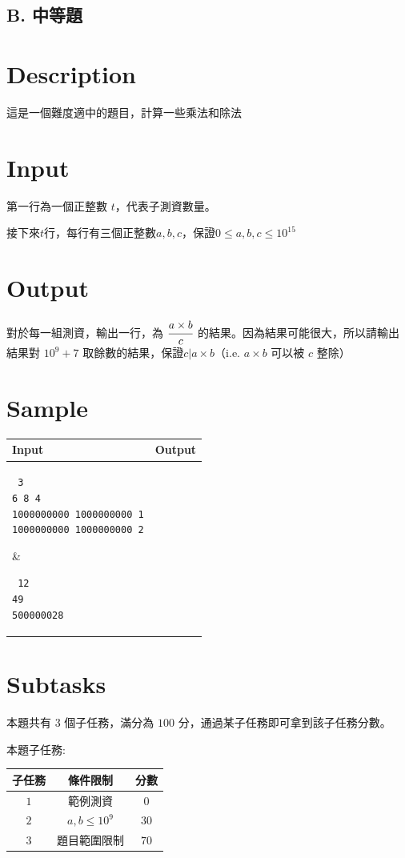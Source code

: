 \documentclass[11pt,a4paper]{article}
\begin{document}
\begin{center}
\section*{B. 中等題}
\end{center}

\section*{Description}

這是一個難度適中的題目，計算一些乘法和除法

\section*{Input}
第一行為一個正整數 $t$，代表子測資數量。

接下來$t$行，每行有三個正整數$a, b, c$，保證$0\leq a, b, c \leq 10^{15}$


\section*{Output}

對於每一組測資，輸出一行，為 $\cfrac{a\times b}{c}$ 的結果。因為結果可能很大，所以請輸出結果對 $10^9 + 7$ 取餘數的結果，保證$c|a\times b$（i.e. $a\times b$ 可以被 $c$ 整除）

\section*{Sample}
\begin{longtable}[!h]{|p{}|p{}|}
\hline
\textbf {Input}	& \textbf {Output} \\
\hline
\parbox[t]{0.5\textwidth} %
{ \tt
3\\
6 8 4\\
1000000000 1000000000 1\\
1000000000 1000000000 2\\
} &
\parbox[t]{0.5\textwidth}
{ \tt
12\\
49\\
500000028\\
} \\
\hline
\end{longtable}


\section*{Subtasks}

本題共有 $3$ 個子任務，滿分為 $100$ 分，通過某子任務即可拿到該子任務分數。

本題子任務:

\begin{center}
    \begin{tabular}{||c c c||}
    \hline
    子任務 & 條件限制 & 分數 \\
    \hline
    $1$ & 範例測資 & $0$ \\
    \hline
    $2$ & $ a, b \leq 10^9$ & $30$  \\
    \hline
    $3$ & 題目範圍限制 & $70$ \\
    \hline
    \end{tabular}
\end{center}
\end{document}
